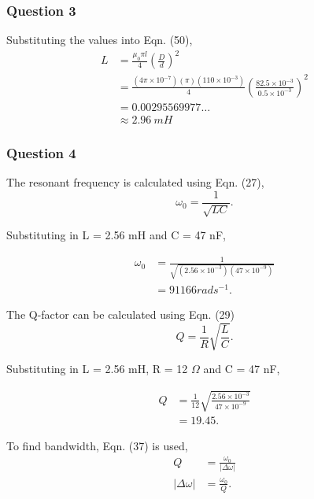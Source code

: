 \documentclass{article}
\begin{document}
\subsubsection{Question 3}
Substituting the values into Eqn. (50),
\begin{equation}
    \begin{split}
        L &= \frac{\mu_0 \pi l}{4} \left(\frac{D}{d}\right)^2 \\
        &= \frac{(4\pi \times 10^{-7})(\pi)(110\times 10^{-3})}
        {4}\left(\frac{82.5\times 10^{-3}}{0.5 \times 10^{-3}}\right)^2 \\
        &= 0.00295569977\dots \\
        &\approx 2.96 \: mH
    \end{split}
\end{equation}
\subsubsection{Question 4}
The resonant frequency is calculated using Eqn. (27),
\begin{equation}
    \omega_0  = \frac{1}{\sqrt{LC}}.
\end{equation}

Substituting in L = 2.56 mH and C = 47 nF,

\begin{equation}
    \begin{split}
    \omega_0 &= \frac{1}{\sqrt{(2.56\times 10^{-3})(47\times 10^{-9})}} \\
    &= 91166 rads^{-1}.    
    \end{split}
\end{equation}

The Q-factor can be calculated using Eqn. (29)
\begin{equation}
    Q = \frac{1}{R}\sqrt{\frac{L}{C}}.
\end{equation}

Substituting in L = 2.56 mH, R = 12 $\Omega$ and C = 47 nF,

\begin{equation}
    \begin{split}
        Q &= \frac{1}{12}\sqrt{\frac{2.56 \times 10^{-3}}{47\times 10^{-9}}} \\
        &= 19.45.
    \end{split}
\end{equation}

To find bandwidth, Eqn. (37) is used,
\begin{equation}
    \begin{split}
        Q &= \frac{\omega_0}{|\Delta\omega|} \\
        |\Delta\omega| &= \frac{\omega_0}{Q}. 
    \end{split}
\end{equation}
\end{document}
